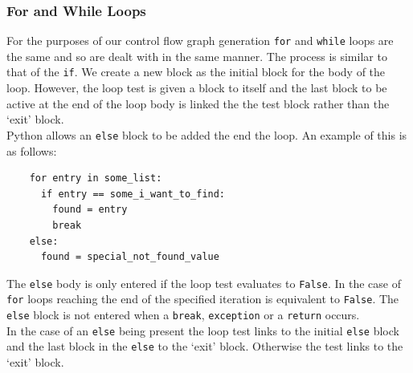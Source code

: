 \documentclass[12pt, titlepage]{article}
\begin{document}
\subsubsection{For and While Loops}
For the purposes of our control flow graph generation \texttt{for} and \texttt{while} loops are the same and so are dealt with in the same manner. The process is similar to that of the \texttt{if}.  We create a new block as the initial block for the body of the loop. However, the loop test is given a block to itself and the last block to be active at the end of the loop body is linked the the test block rather than the `exit' block. \\
\indent Python allows an \texttt{else} block to be added the end the loop. An example of this is as follows:
\begin{lstlisting}
    for entry in some_list:
      if entry == some_i_want_to_find:
        found = entry
        break
    else:
      found = special_not_found_value
\end{lstlisting}
The \texttt{else} body is only entered if the loop test evaluates to \texttt{False}. In the case of \texttt{for} loops reaching the end of the specified iteration is equivalent to \texttt{False}. The \texttt{else} block is not entered when a \texttt{break}, \texttt{exception} or a \texttt{return} occurs. \\
\indent In the case of an \texttt{else} being present the loop test links to the initial \texttt{else} block and the last block in the \texttt{else} to the `exit' block. Otherwise the test links to the `exit' block.
\end{document}
